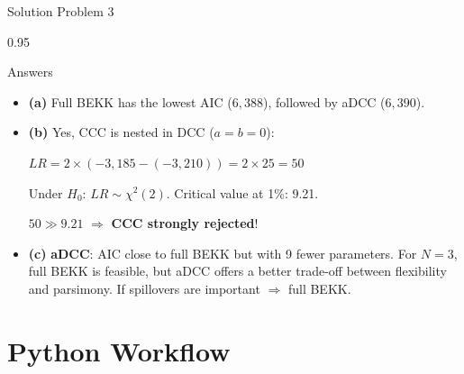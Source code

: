 \documentclass[9pt, aspectratio=169, t]{beamer}
\begin{document}
\begin{frame}{Solution Problem 3}
    \begin{cminipage}{0.95\textwidth}
    {\footnotesize
    \begin{exampleblock}{Answers}
        \begin{itemize}\setlength{\itemsep}{0pt}
            \item \textbf{(a)} Full BEKK has the lowest AIC ($6{,}388$), followed by aDCC ($6{,}390$).

            \vspace{0.15cm}

            \item \textbf{(b)} Yes, CCC is nested in DCC ($a = b = 0$):

            $LR = 2 \times (-3{,}185 - (-3{,}210)) = 2 \times 25 = 50$

            Under $H_0$: $LR \sim \chi^2(2)$. Critical value at 1\%: 9.21.

            $50 \gg 9.21$ $\Rightarrow$ \textbf{CCC strongly rejected}!

            \vspace{0.15cm}

            \item \textbf{(c)} \textbf{aDCC}: AIC close to full BEKK but with 9 fewer parameters. For $N = 3$, full BEKK is feasible, but aDCC offers a better trade-off between flexibility and parsimony. If spillovers are important $\Rightarrow$ full BEKK.
        \end{itemize}
    \end{exampleblock}
    }
    \end{cminipage}
\end{frame}

\section{Python Workflow}
\end{document}
